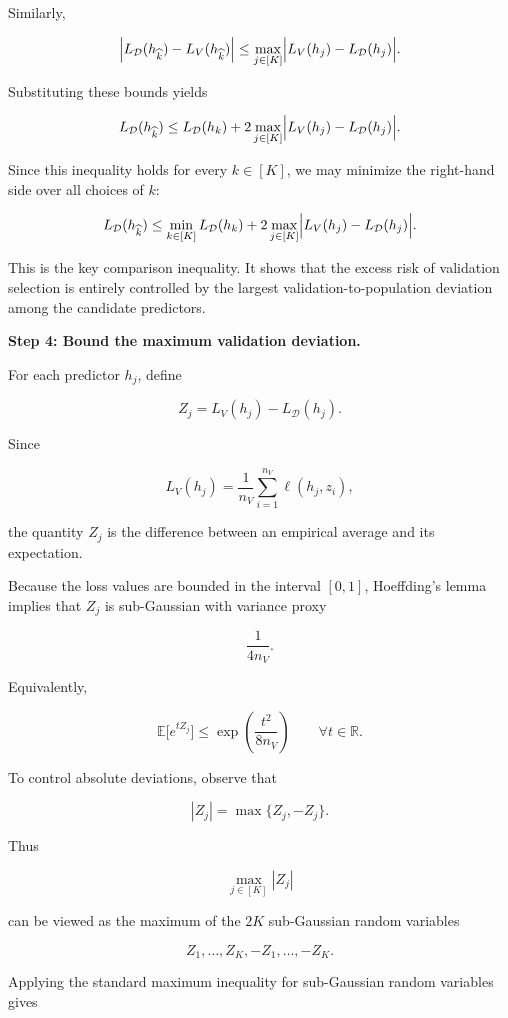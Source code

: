 \documentclass[11pt]{article}
\begin{document}
\begin{enumerate}
\begin{solutionbox}
Similarly,

\[
\Bigl|
L_{\mathcal D}(h_{\widehat{k}})
-
L_V(h_{\widehat{k}})
\Bigr|
\le
\max_{j\in[K]}
\Bigl|
L_V(h_j)
-
L_{\mathcal D}(h_j)
\Bigr|.
\]

Substituting these bounds yields

\[
L_{\mathcal D}(h_{\widehat{k}})
\le
L_{\mathcal D}(h_k)
+
2
\max_{j\in[K]}
\Bigl|
L_V(h_j)
-
L_{\mathcal D}(h_j)
\Bigr|.
\]

Since this inequality holds for every \(k\in[K]\), we may minimize the right-hand side over all choices of \(k\):

\[
L_{\mathcal D}(h_{\widehat{k}})
\le
\min_{k\in[K]}
L_{\mathcal D}(h_k)
+
2
\max_{j\in[K]}
\Bigl|
L_V(h_j)
-
L_{\mathcal D}(h_j)
\Bigr|.
\]

This is the key comparison inequality. It shows that the excess risk of validation selection is entirely controlled by the largest validation-to-population deviation among the candidate predictors.

\medskip

\textbf{Step 4: Bound the maximum validation deviation.}

For each predictor \(h_j\), define

\[
Z_j
=
L_V(h_j)
-
L_{\mathcal D}(h_j).
\]

Since

\[
L_V(h_j)
=
\frac{1}{n_V}
\sum_{i=1}^{n_V}
\ell(h_j,z_i),
\]

the quantity \(Z_j\) is the difference between an empirical average and its expectation.

Because the loss values are bounded in the interval \([0,1]\), Hoeffding's lemma implies that \(Z_j\) is sub-Gaussian with variance proxy

\[
\frac{1}{4n_V}.
\]

Equivalently,

\[
\mathbb E
\bigl[
e^{tZ_j}
\bigr]
\le
\exp\!\left(
\frac{t^2}{8n_V}
\right)
\qquad
\forall t\in\mathbb R.
\]

To control absolute deviations, observe that

\[
|Z_j|
=
\max\{Z_j,-Z_j\}.
\]

Thus

\[
\max_{j\in[K]}|Z_j|
\]

can be viewed as the maximum of the \(2K\) sub-Gaussian random variables

\[
Z_1,\ldots,Z_K,
-Z_1,\ldots,-Z_K.
\]

Applying the standard maximum inequality for sub-Gaussian random variables gives


\end{solutionbox}
\end{enumerate}
\end{document}
